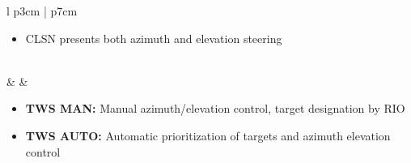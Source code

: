 \documentclass[8pt,usenames,dvipsnames,twoside]{article}
\begin{document}
\begin{center}
\begin{longtable}{l p{3cm} | p{7cm}}
\begin{minipage}[t]{\linewidth}
\begin{itemize}
\begin{itemize}
							\item CLSN presents both azimuth and elevation steering
						\end{itemize}
					\end{itemize}
				\end{minipage} \\
				\midrule
				\textbullet &  & 
				\begin{minipage}[t]{\linewidth}
					\vspace{-7pt}
					\begin{itemize}
						\item \textbf{TWS MAN:} Manual azimuth/elevation control, target designation by RIO
						\item \textbf{TWS AUTO:} Automatic prioritization of targets and azimuth elevation control
					\end{itemize}
				\end{minipage} \\
				\bottomrule
			\end{longtable}
		\end{center}
	
		\clearpage
	
\end{document}

